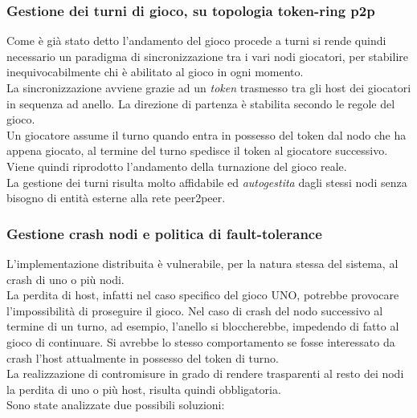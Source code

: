 \documentclass[10pt,a4paper]{article}
\begin{document}
\subsubsection{Gestione dei turni di gioco, su topologia token-ring p2p}
Come è già stato detto l'andamento del gioco procede a turni si rende quindi necessario un paradigma di sincronizzazione tra i vari nodi giocatori, per stabilire inequivocabilmente chi è abilitato al gioco in ogni momento.\\ La sincronizzazione avviene grazie ad un \textit{token} trasmesso tra gli host dei giocatori in sequenza ad anello. La direzione di partenza è stabilita secondo le regole del gioco.\\ Un giocatore assume il turno quando entra in possesso del token dal nodo che ha appena giocato, al termine del turno spedisce il token al giocatore successivo. Viene quindi riprodotto l'andamento della turnazione del gioco reale.\\ 
La gestione dei turni risulta molto affidabile ed \textit{autogestita} dagli stessi nodi senza bisogno di entità esterne alla rete peer2peer.

\subsubsection{Gestione crash nodi e politica di fault-tolerance}
L'implementazione distribuita è vulnerabile, per la natura stessa del sistema, al crash di uno o più nodi. \\La perdita di host, infatti nel caso specifico del gioco UNO, potrebbe provocare l'impossibilità di proseguire il gioco. Nel caso di crash del nodo successivo al termine di un turno, ad esempio, l'anello si bloccherebbe, impedendo di fatto al gioco di continuare. Si avrebbe lo stesso comportamento se fosse interessato da crash l'host attualmente in possesso del token di turno.\\ La realizzazione di contromisure in grado di rendere trasparenti al resto dei nodi la perdita di uno o più host, risulta quindi obbligatoria. \\ Sono state analizzate due possibili soluzioni:
\end{document}
